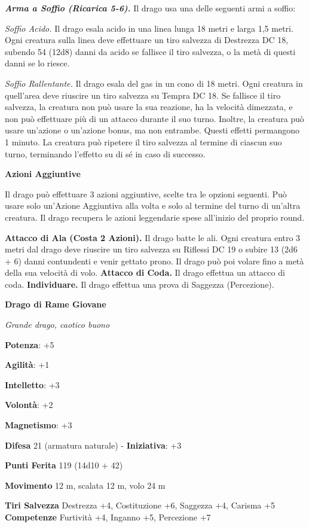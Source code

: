 \begin{multicols}{2}
\emph{\textbf{Arma a Soffio (Ricarica 5-6).}} Il drago usa una delle
seguenti armi a soffio:

\emph{Soffio Acido.} Il drago esala acido in una linea lunga 18 metri e
larga 1,5 metri. Ogni creatura sulla linea deve effettuare un tiro
salvezza di Destrezza DC 18, subendo 54 (12d8) danni da acido se
fallisce il tiro salvezza, o la metà di questi danni se lo riesce.

\emph{Soffio Rallentante.} Il drago esala del gas in un cono di 18
metri. Ogni creatura in quell'area deve riuscire un tiro salvezza su Tempra DC 18. Se fallisce il tiro salvezza, la creatura non può
usare la sua reazione, ha la velocità dimezzata, e non può effettuare
più di un attacco durante il suo turno. Inoltre, la creatura può usare
un'azione o un'azione bonus, ma non entrambe. Questi effetti permangono
1 minuto. La creatura può ripetere il tiro salvezza al termine di
ciascun suo turno, terminando l'effetto su di sé in caso di successo.

\textbf{Azioni Aggiuntive}

Il drago può effettuare 3 azioni aggiuntive, scelte tra le opzioni
seguenti. Può usare solo un'Azione Aggiuntiva alla volta e solo al
termine del turno di un'altra creatura. Il drago recupera le azioni
leggendarie spese all'inizio del proprio round.

\textbf{Attacco di Ala (Costa 2 Azioni).} Il drago batte le ali. Ogni
creatura entro 3 metri dal drago deve riuscire un tiro salvezza su Riflessi DC 19 o subire 13 (2d6 + 6) danni contundenti e venir gettato
prono. Il drago può poi volare fino a metà della sua velocità di volo.
\textbf{Attacco di Coda.} Il drago effettua un attacco di coda.
\textbf{Individuare.} Il drago effettua una prova di Saggezza
(Percezione).

\textbf{Drago di Rame Giovane}

\emph{Grande drago, caotico buono}

\textbf{Potenza}: +5

\textbf{Agilità}: +1

\textbf{Intelletto}: +3

\textbf{Volontà}: +2

\textbf{Magnetismo}: +3

\textbf{Difesa} 21 (armatura naturale) - \textbf{Iniziativa}: +3

\textbf{Punti Ferita} 119 (14d10 + 42)

\textbf{Movimento} 12 m, scalata 12 m, volo 24 m

\textbf{Tiri Salvezza} Destrezza +4, Costituzione +6, Saggezza +4,
Carisma +5 \textbf{Competenze} Furtività +4, Inganno +5, Percezione +7


\end{multicols}
